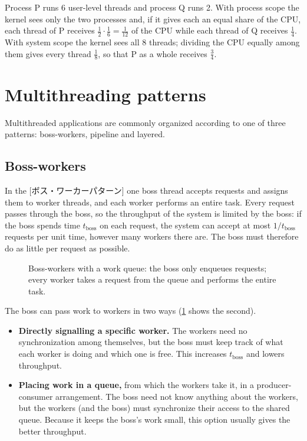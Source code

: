 \documentclass[../main.tex]{subfiles}
\begin{document}
\begin{example}
  Process P runs 6 user-level threads and process Q runs 2.  With process
  scope the kernel sees only the two processes and, if it gives each an
  equal share of the CPU, each thread of P receives
  $\frac{1}{2}\cdot\frac{1}{6} = \frac{1}{12}$ of the CPU while each thread
  of Q receives $\frac{1}{4}$.  With system scope the kernel sees all 8
  threads; dividing the CPU equally among them gives every thread
  $\frac{1}{8}$, so that P as a whole receives $\frac{3}{4}$.
\end{example}

\section{Multithreading patterns}
\label{sec:l03-patterns}

Multithreaded applications are commonly organized according to one of three
patterns: boss-workers, pipeline and layered.

\subsection{Boss-workers}

In the [ボス・ワーカーパターン] one boss thread
accepts requests and assigns them to worker threads, and each worker
performs an entire task.  Every request passes through the boss, so the
throughput of the system is limited by the boss: if the boss spends time
$t_{\mathrm{boss}}$ on each request, the system can accept at most
$1/t_{\mathrm{boss}}$ requests per unit time, however many workers there
are.  The boss must therefore do as little per request as possible.

\begin{figure}[htbp]
  \centering
  
  \caption{Boss-workers with a work queue: the boss only enqueues requests;
    every worker takes a request from the queue and performs the entire
    task.}
  \label{fig:l03-boss-workers}
\end{figure}

The boss can pass work to workers in two ways
(\cref{fig:l03-boss-workers} shows the second).
\begin{itemize}
  \item \textbf{Directly signalling a specific worker.}  The workers need
    no synchronization among themselves, but the boss must keep track of
    what each worker is doing and which one is free.  This increases
    $t_{\mathrm{boss}}$ and lowers throughput.
  \item \textbf{Placing work in a queue,} from which the workers take it,
    in a producer-consumer arrangement.  The boss need not know anything about
    the workers, but the workers (and the boss) must synchronize their
    access to the shared queue.  Because it keeps the boss's work small,
    this option usually gives the better throughput.
\end{itemize}
\end{document}
